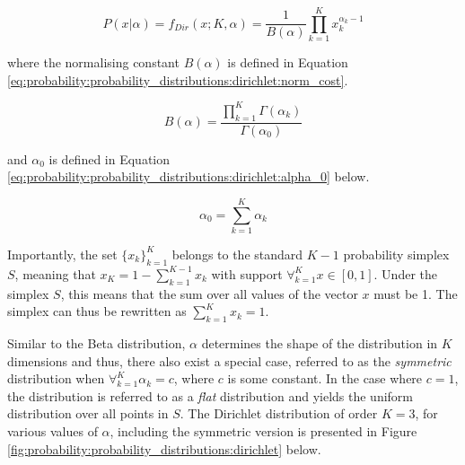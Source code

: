 \begin{equation}
      \label{eq:probability:probability_distributions:dirichlet:pdf}
      P(x \vert \alpha) =  f_{Dir}(x; K, \alpha) = \frac{1}{B(\alpha)}  \prod_{k=1}^{K} x_{k}^{\alpha_{k} - 1}
\end{equation}

where the normalising constant $B(\alpha)$ is defined in Equation \ref{eq:probability:probability_distributions:dirichlet:norm_cost}.

\begin{equation}
      \label{eq:probability:probability_distributions:dirichlet:norm_cost}
      B(\alpha) = \frac{\prod_{k=1}^{K} \Gamma(\alpha_{k})}{\Gamma(\alpha_{0})}
\end{equation}

and $\alpha_{0}$ is defined in Equation \ref{eq:probability:probability_distributions:dirichlet:alpha_0} below.

\begin{equation}
      \label{eq:probability:probability_distributions:dirichlet:alpha_0}
      \alpha_{0} = \sum_{k=1}^{K}\alpha_{k}
\end{equation}

Importantly, the set $\{x_{k}\}_{k=1}^{K}$ belongs to the standard $K-1$ probability simplex $S$, meaning that $x_{K} = 1 - \sum_{k=1}^{K-1}x_{k}$ with support $\forall_{k=1}^{K} x \in [0,1]$. Under the simplex $S$, this means that the sum over all values of the vector $x$ must be 1. The simplex can thus be rewritten as $\sum_{k=1}^{K}x_{k} = 1$.

Similar to the Beta distribution, $\alpha$ determines the shape of the distribution in $K$ dimensions and thus, there also exist a special case, referred to as the \textit{symmetric} distribution when $\forall_{k=1}^{K} \alpha_{k} = c$, where $c$ is some constant. In the case where $c = 1$, the distribution is referred to as a \textit{flat} distribution and yields the uniform distribution over all points in $S$. The Dirichlet distribution of order $K = 3$, for various values of $\alpha$, including the symmetric version is presented in Figure \ref{fig:probability:probability_distributions:dirichlet} below.

